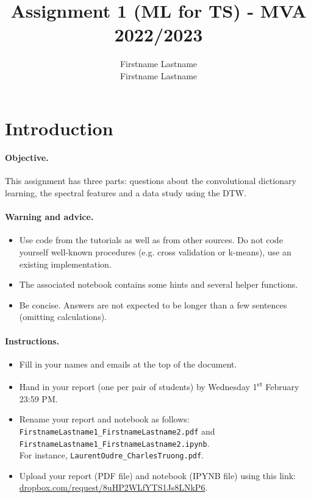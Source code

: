 \documentclass[11pt]{article}
\title{Assignment 1 (ML for TS) - MVA 2022/2023}
\author{
Firstname Lastname \email{youremail1@mail.com} \\ %
Firstname Lastname \email{youremail2@mail.com} %
}
\begin{document}
\maketitle

\section{Introduction}

\paragraph{Objective.} This assignment has three parts: questions about the convolutional dictionary learning, the spectral features and a data study using the DTW. 

\paragraph{Warning and advice.} 
\begin{itemize}
    \item Use code from the tutorials as well as from other sources. Do not code yourself well-known procedures (e.g. cross validation or k-means), use an existing implementation. 
    \item The associated notebook contains some hints and several helper functions.
    \item Be concise. Answers are not expected to be longer than a few sentences (omitting calculations).
\end{itemize}



\paragraph{Instructions.}
\begin{itemize}
    \item Fill in your names and emails at the top of the document.
    \item Hand in your report (one per pair of students) by Wednesday 1\textsuperscript{st} February 23:59 PM.
    \item Rename your report and notebook as follows:\\ \texttt{FirstnameLastname1\_FirstnameLastname2.pdf} and\\ \texttt{FirstnameLastname1\_FirstnameLastname2.ipynb}.\\
    For instance, \texttt{LaurentOudre\_CharlesTruong.pdf}.
    \item Upload your report (PDF file) and notebook (IPYNB file) using this link: \href{https://www.dropbox.com/request/8uHP2WLfYTS1Js8LNkP6}{dropbox.com/request/8uHP2WLfYTS1Js8LNkP6}.
\end{itemize}
\end{document}
